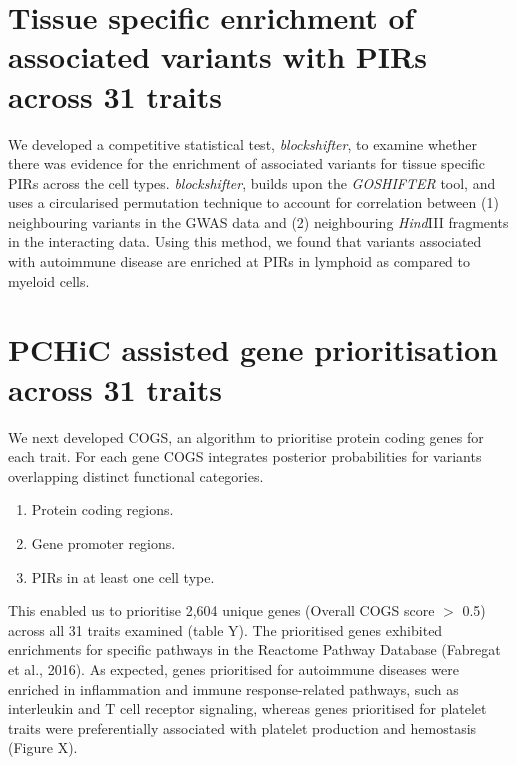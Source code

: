 \documentclass[a4paper,11pt]{book}
\begin{document}
\section{Tissue specific enrichment of associated variants with PIRs across 31 traits}
We developed a competitive statistical test, \textit{blockshifter}, to examine whether there was evidence for the enrichment of associated variants for tissue specific PIRs across the cell types. \textit{blockshifter}, builds upon the \textit{GOSHIFTER} tool, and uses a circularised permutation technique to account for correlation between (1) neighbouring variants in the GWAS data and (2) neighbouring \textit{Hind}III fragments in the interacting data. Using this method, we found that variants associated with autoimmune disease are enriched at PIRs in lymphoid as compared to myeloid cells.

\section{PCHiC assisted gene prioritisation across 31 traits} 
We next developed COGS, an algorithm to prioritise protein coding genes for each trait. For each gene COGS integrates posterior probabilities for variants overlapping distinct functional categories.
\begin{enumerate}
	\item Protein coding regions.
	\item Gene promoter regions.
	\item PIRs in at least one cell type. 
\end{enumerate}
This enabled us to prioritise 2,604  unique genes (Overall COGS score $>$ 0.5) across all 31 traits examined (table Y). The prioritised genes exhibited enrichments for specific pathways in the Reactome Pathway Database (Fabregat et al., 2016). As expected, genes prioritised for autoimmune diseases were enriched in inflammation and immune response-related pathways, such as interleukin and T cell receptor signaling, whereas genes prioritised for platelet traits were preferentially associated with platelet production and hemostasis (Figure X). 

\end{document}

